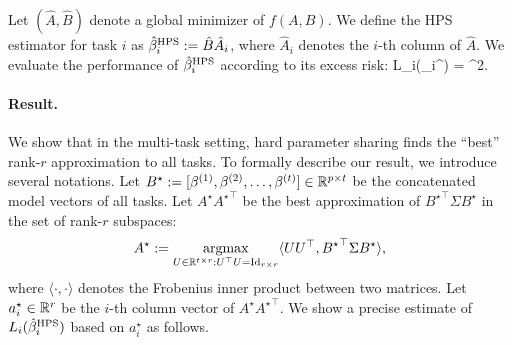 Let $(\hat A, \hat B)$ denote a global minimizer of $f(A, B)$.
We define the HPS estimator for task $i$ as $\hat \beta_i^{\textup{HPS}} := \hat B \hat A_i$, where $\hat A_i$ denotes the $i$-th column of $\hat A$.
We evaluate the performance of $\hat{\beta}_i^{\textup{HPS}}$ according to its excess risk:
\be\label{ith_loss}
    L_i(\hat{\beta}_i^{\MTL}) = ^2.
\ee

\paragraph{Result.} We show that in the multi-task setting, hard parameter sharing finds the ``best'' rank-$r$ approximation to all tasks.
To formally describe our result, we introduce several notations.
Let $B^\star := [{\beta}^{(1)},{\beta}^{(2)},\dots,{\beta}^{(t)}] \in \mathbb{R}^{p\times t}$ be the concatenated model vectors of all tasks.
Let $A^{\star} {A^{\star}}^{\top}$ be the best approximation of ${B^{\star}}^\top\Sigma B^{\star}$ in the set of rank-$r$ subspaces:
\begin{align}\label{eq_A_star}
	A^{\star} \define \argmax{U\in\real^{t\times r} : U^{\top} U = \id_{r\times r}} \inner{U U^{\top}} {{B^{\star}}^{\top} \Sigma B^{\star}},
\end{align}
where $\langle \cdot ,\cdot \rangle $ denotes the Frobenius inner product between two matrices.
Let $a_i^{\star}\in\mathbb{R}^r$ be the $i$-th column vector of $A^{\star}{A^{\star}}^{\top}$.
We show a precise estimate of $L_i(\hat{\beta}_i^{\textup{HPS}})$ based on $a_i^{\star}$ as follows.

